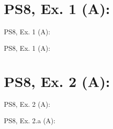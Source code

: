 \section{PS8, Ex. 1 (A): }

\begin{frame}{PS8, Ex. 1 (A): }
  \begin{multicols}{2}
    \vfill\null\columnbreak
    \vfill\null
  \end{multicols}
\end{frame}

\begin{frame}{PS8, Ex. 1 (A): }
  \begin{multicols}{2}
    \vfill\null\columnbreak
    \vfill\null
  \end{multicols}

\end{frame}



\section{PS8, Ex. 2 (A): }

\begin{frame}{PS8, Ex. 2 (A): }
  \begin{multicols}{2}
    \vfill\null\columnbreak
    \vfill\null
  \end{multicols}
\end{frame}

\begin{frame}{PS8, Ex. 2.a (A): }
  \begin{multicols}{2}
    \vfill\null\columnbreak
    \vfill\null
  \end{multicols}
\end{frame}

